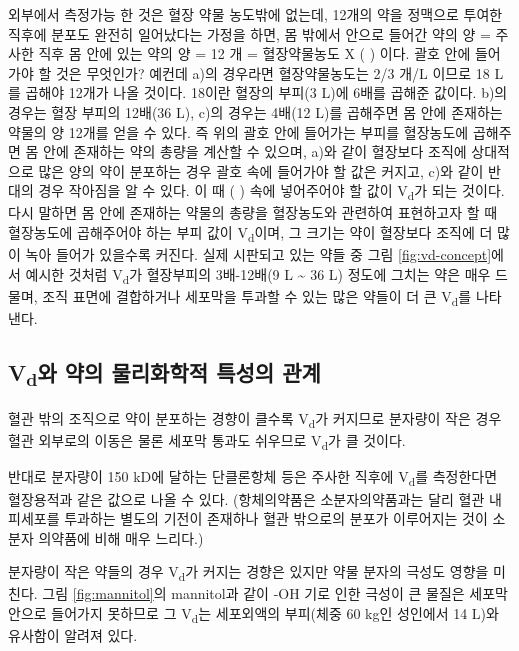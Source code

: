 \documentclass[
  11pt,
  krantz2, a4paper, twoside]{krantz}
\begin{document}
외부에서 측정가능 한 것은 혈장 약물 농도밖에 없는데, 12개의 약을
정맥으로 투여한 직후에 분포도 완전히 일어났다는 가정을 하면, 몸 밖에서
안으로 들어간 약의 양 = 주사한 직후 몸 안에 있는 약의 양 = 12 개 =
혈장약물농도 X ( ) 이다. 괄호 안에 들어가야 할 것은 무엇인가? 예컨데
a)의 경우라면 혈장약물농도는 2/3 개/L 이므로 18 L를 곱해야 12개가 나올
것이다. 18이란 혈장의 부피(3 L)에 6배를 곱해준 값이다. b)의 경우는 혈장
부피의 12배(36 L), c)의 경우는 4배(12 L)를 곱해주면 몸 안에 존재하는
약물의 양 12개를 얻을 수 있다. 즉 위의 괄호 안에 들어가는 부피를
혈장농도에 곱해주면 몸 안에 존재하는 약의 총량을 계산할 수 있으며, a)와
같이 혈장보다 조직에 상대적으로 많은 양의 약이 분포하는 경우 괄호 속에
들어가야 할 값은 커지고, c)와 같이 반대의 경우 작아짐을 알 수 있다. 이
때 ( ) 속에 넣어주어야 할 값이 V\textsubscript{d}가 되는 것이다. 다시 말하면 몸 안에
존재하는 약물의 총량을 혈장농도와 관련하여 표현하고자 할 때 혈장농도에
곱해주어야 하는 부피 값이 V\textsubscript{d}이며, 그 크기는 약이 혈장보다 조직에 더
많이 녹아 들어가 있을수록 커진다. 실제 시판되고 있는 약들 중 그림 \ref{fig:vd-concept}에서 예시한 것처럼 V\textsubscript{d}가 혈장부피의 3배-12배(9 L \textasciitilde{} 36 L) 정도에
그치는 약은 매우 드물며, 조직 표면에 결합하거나 세포막을 투과할 수 있는
많은 약들이 더 큰 V\textsubscript{d}를 나타낸다.

\hypertarget{vduxc640-uxc57duxc758-uxbb3cuxb9acuxd654uxd559uxc801-uxd2b9uxc131uxc758-uxad00uxacc4}{%
\subsection{\texorpdfstring{V\textsubscript{d}와 약의 물리화학적 특성의 관계}{Vd와 약의 물리화학적 특성의 관계}}\label{vduxc640-uxc57duxc758-uxbb3cuxb9acuxd654uxd559uxc801-uxd2b9uxc131uxc758-uxad00uxacc4}}

혈관 밖의 조직으로 약이 분포하는 경향이 클수록 V\textsubscript{d}가 커지므로 분자량이
작은 경우 혈관 외부로의 이동은 물론 세포막 통과도 쉬우므로 V\textsubscript{d}가 클
것이다.

반대로 분자량이 150 kD에 달하는 단클론항체 등은 주사한 직후에 V\textsubscript{d}를
측정한다면 혈장용적과 같은 값으로 나올 수 있다. (항체의약품은
소분자의약품과는 달리 혈관 내피세포를 투과하는 별도의 기전이 존재하나
혈관 밖으로의 분포가 이루어지는 것이 소분자 의약품에 비해 매우 느리다.)

분자량이 작은 약들의 경우 V\textsubscript{d}가 커지는 경향은 있지만 약물 분자의 극성도
영향을 미친다. 그림 \ref{fig:mannitol}의 mannitol과 같이 -OH 기로 인한 극성이 큰 물질은
세포막 안으로 들어가지 못하므로 그 V\textsubscript{d}는 세포외액의 부피(체중 60 kg인
성인에서 14 L)와 유사함이 알려져 있다.
\end{document}
